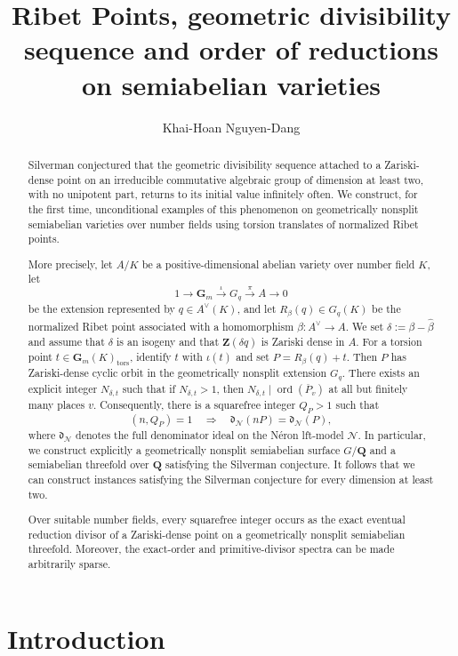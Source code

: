 \documentclass[11pt,letterpaper,reqno]{amsart}
\title[Ribet Points, geometric divisibility sequence and order of reductions]{Ribet Points, geometric divisibility sequence and order of reductions on semiabelian varieties}
\author{Khai-Hoan Nguyen-Dang}
\date{}
\theoremstyle{definition}
\theoremstyle{remark}
\newcommand{\Gm}{\mathbf G_m}
\newcommand{\ord}{\operatorname{ord}}
\newcommand{\tors}{\mathrm{tors}}
\begin{document}
\begin{abstract}
Silverman conjectured that the geometric divisibility sequence attached to a Zariski-dense point on an irreducible commutative algebraic group of dimension at least two, with no unipotent part, returns to its initial value infinitely often. We construct, for the first time, unconditional examples of this phenomenon on geometrically nonsplit semiabelian varieties over number fields using torsion translates of normalized Ribet points.

More precisely, let $A/K$ be a positive-dimensional abelian variety over number field $K$, let
\[
1\longrightarrow\Gm\xrightarrow{\iota}G_q\xrightarrow{\pi}A
 \longrightarrow0
\]
be the extension represented by $q\in A^\vee(K)$, and let
$R_\beta(q)\in G_q(K)$ be the normalized Ribet point associated with a
homomorphism $\beta:A^\vee\to A$.  We set
$\delta:=\beta-\widehat\beta$ and assume that $\delta$ is an isogeny and that
$\mathbf Z(\delta q)$ is Zariski dense in $A$.  For a torsion point
$t\in\Gm(K)_{\tors}$, identify $t$ with $\iota(t)$ and set $P=R_\beta(q)+t$. Then $P$ has Zariski-dense cyclic orbit in the geometrically nonsplit extension $G_q$.  There exists an explicit integer $N_{\delta,t}$ such that if
$N_{\delta,t}>1$, then $N_{\delta,t}\mid \ord(\overline P_v)$ at all but finitely many places $v$.  Consequently, there is a squarefree integer $Q_P>1$ such that
\[
 (n,Q_P)=1
 \quad\Longrightarrow\quad
 \mathfrak d_{\mathcal N}(nP)=\mathfrak d_{\mathcal N}(P),
\]
where $\mathfrak d_{\mathcal N}$ denotes the full denominator ideal on the
Néron lft-model $\mathcal N$. In particular, we construct explicitly a geometrically nonsplit semiabelian surface $G/\mathbf Q$ and a semiabelian threefold over $\mathbf Q$ satisfying the Silverman conjecture. It follows that we can construct instances satisfying the Silverman conjecture for every dimension at least two. 

Over suitable number fields, every squarefree integer occurs as the exact eventual reduction divisor of a Zariski-dense point on a geometrically nonsplit semiabelian threefold. Moreover, the exact-order and primitive-divisor spectra can be made arbitrarily sparse.
\end{abstract}

\maketitle
\enlargethispage{3pt}

\section{Introduction}\label{sec:introduction}
\end{document}
